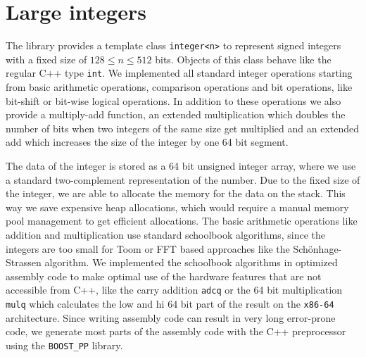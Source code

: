 \documentclass[oribibl,a4paper]{llncs2e/llncs}
\begin{document}

\section{Large integers}
The library provides a template class \verb|integer<n>| to represent signed integers with a fixed size of $128 \le n \le 512$ bits.
Objects of this class behave like the regular C++ type \verb|int|.
We implemented all standard integer operations starting from basic arithmetic operations, comparison operations and bit operations, like bit-shift or bit-wise logical operations.
In addition to these operations we also provide a multiply-add function, an extended multiplication which doubles the number of bits when two integers of the same size get multiplied and an extended add which increases the size of the integer by one 64 bit segment.

The data of the integer is stored as a 64 bit unsigned integer array, where we use a standard two-complement representation of the number.
Due to the fixed size of the integer, we are able to allocate the memory for the data on the stack.
This way we save expensive heap allocations, which would require a manual memory pool management to get efficient allocations.
The basic arithmetic operations like addition and multiplication use standard schoolbook algorithms, since the integers are too small for Toom\cite{Toom} or FFT based approaches like the Sch\"onhage-Strassen algorithm\cite{Schonhage}.
We implemented the schoolbook algorithms in optimized assembly code to make optimal use of the hardware features that are not accessible from C++, like the carry addition \verb|adcq| or the 64 bit multiplication \verb|mulq| which calculates the low and hi 64 bit part of the result on the \verb|x86-64| architecture.
Since writing assembly code can result in very long error-prone code, we generate most parts of the assembly code with the C++ preprocessor using the \verb|BOOST_PP| library.
\end{document}
